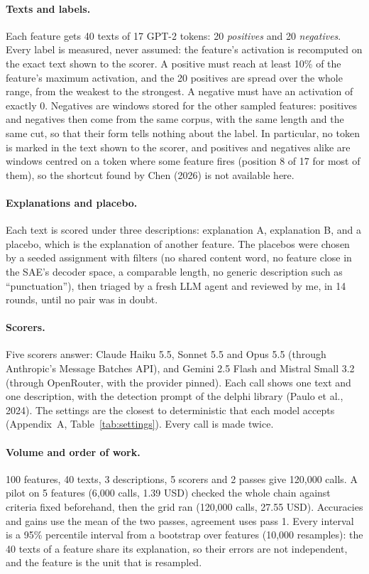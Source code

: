 \documentclass[11pt]{article}
\begin{document}
\paragraph{Texts and labels.} Each feature gets 40 texts of 17 GPT-2 tokens: 20
\emph{positives} and 20 \emph{negatives}. Every label is measured, never assumed: the
feature's activation is recomputed on the exact text shown to the scorer. A positive
must reach at least 10\% of the feature's maximum activation, and the 20 positives are
spread over the whole range, from the weakest to the strongest. A negative must have
an activation of exactly 0. Negatives are windows stored for the other sampled
features: positives and negatives then come from the same corpus, with the same
length and the same cut, so that their form tells nothing about the label. In
particular, no token is marked in the text shown to the scorer, and positives and
negatives alike are windows centred on a token where some feature fires (position 8 of
17 for most of them), so the shortcut found by Chen (2026) is not available here.

\paragraph{Explanations and placebo.} Each text is scored under three descriptions:
explanation A, explanation B, and a placebo, which is the explanation of another
feature. The placebos were chosen by a seeded assignment with filters (no shared
content word, no feature close in the SAE's decoder space, a comparable length, no
generic description such as ``punctuation''), then triaged by a fresh LLM agent and
reviewed by me, in 14 rounds, until no pair was in doubt.

\paragraph{Scorers.} Five scorers answer: Claude Haiku 5.5, Sonnet 5.5 and Opus 5.5
(through Anthropic's Message Batches API), and Gemini 2.5 Flash and Mistral Small 3.2
(through OpenRouter, with the provider pinned). Each call shows one text and one
description, with the detection prompt of the delphi library (Paulo et al., 2024). The settings are the closest to deterministic that
each model accepts (Appendix~A, Table~\ref{tab:settings}). Every call is made twice.

\paragraph{Volume and order of work.} 100 features, 40 texts, 3 descriptions, 5
scorers and 2 passes give 120,000 calls. A pilot on 5 features (6,000 calls, 1.39 USD)
checked the whole chain against criteria fixed beforehand, then the grid ran (120,000
calls, 27.55 USD). Accuracies and gains use the mean of the two passes, agreement uses
pass 1. Every interval is a 95\% percentile interval from a bootstrap over features
(10,000 resamples): the 40 texts of a feature share its explanation, so their errors
are not independent, and the feature is the unit that is resampled.
\end{document}
